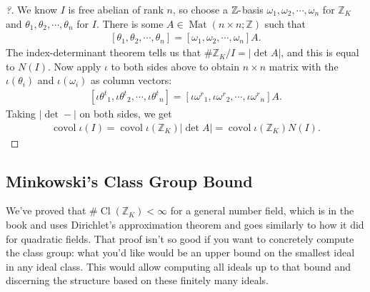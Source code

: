 \begin{proof}[?]

We know \(I\) is free abelian of rank \(n\), so choose a
\({\mathbb{Z}}{\hbox{-}}\)basis
\({ {\omega}_1, {\omega}_2, \cdots, {\omega}_{n}}\) for
\({\mathbb{Z}}_K\) and
\({ {\theta}_1, {\theta}_2, \cdots, {\theta}_{n}}\) for \(I\). There is
some \(A\in \operatorname{Mat}(n\times n; {\mathbb{Z}})\) such that
\begin{align*}
{\left[ {{ {\theta}_1, {\theta}_2, \cdots, {\theta}_{n}}} \right]} = {\left[ {{ {\omega}_1, {\omega}_2, \cdots, {\omega}_{n}}} \right]}A
.\end{align*}
The index-determinant theorem tells us that
\(\# {\mathbb{Z}}_K/I = {\left\lvert {\det A} \right\rvert}\), and this
is equal to \(N(I)\). Now apply \(\iota\) to both sides above to obtain
\(n\times n\) matrix with the \(\iota(\theta_i)\) and
\(\iota(\omega_i)\) as column vectors:
\begin{align*}
{\left[ {{ { \iota \theta^t }_1, { \iota \theta^t }_2, \cdots, { \iota \theta^t }_{n}} } \right]} 
= 
{\left[ {{ {\iota \omega^r}_1, {\iota \omega^r}_2, \cdots, {\iota \omega^r}_{n}}} \right]}A
.\end{align*}
Taking \({\left\lvert {\det{{-}}} \right\rvert}\) on both sides, we get
\begin{align*}
\operatorname{covol}\iota(I) 
= \operatorname{covol}\iota({\mathbb{Z}}_K) {\left\lvert {\det A} \right\rvert} 
= \operatorname{covol}\iota({\mathbb{Z}}_K) N(I)
.\end{align*}

\end{proof}

\hypertarget{minkowskis-class-group-bound}{%
\subsection{Minkowski's Class Group
Bound}\label{minkowskis-class-group-bound}}

\begin{remark}

We've proved that \(\# { \operatorname{Cl}} ({\mathbb{Z}}_K) < \infty\)
for a general number field, which is in the book and uses Dirichlet's
approximation theorem and goes similarly to how it did for quadratic
fields. That proof isn't so good if you want to concretely compute the
class group: what you'd like would be an upper bound on the smallest
ideal in any ideal class. This would allow computing all ideals up to
that bound and discerning the structure based on these finitely many
ideals.

\end{remark}

